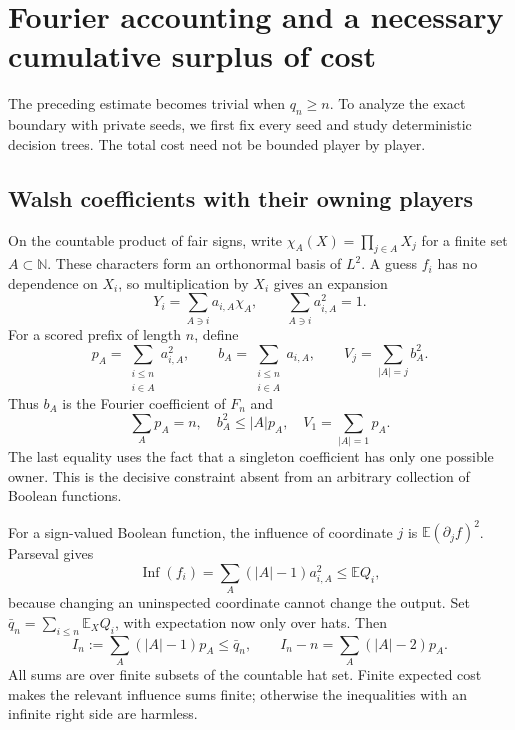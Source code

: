 \documentclass[11pt,letterpaper]{article}
\theoremstyle{definition}
\newcommand{\N}{\mathbb N}
\newcommand{\E}{\mathbb E}
\DeclareMathOperator{\Inf}{Inf}
\begin{document}
\section{Fourier accounting and a necessary cumulative surplus of cost}
\label{mbg:rnd:sec:fourier}

The preceding estimate becomes trivial when $q_n\ge n$. To analyze
the exact boundary with private seeds, we first fix every seed and
study deterministic decision trees. The total cost need not be bounded
player by player.

\subsection{Walsh coefficients with their owning players}

On the countable product of fair signs, write
$\chi_A(X)=\prod_{j\in A}X_j$ for a finite set $A\subset\N$.
These characters form an orthonormal basis of $L^2$. A guess $f_i$ has
no dependence on $X_i$, so multiplication by $X_i$ gives an expansion
\begin{equation}
 Y_i=\sum_{A\ni i}a_{i,A}\chi_A,
 \qquad \sum_{A\ni i}a_{i,A}^2=1.
 \label{mbg:rnd:eq:owner-expansion}
\end{equation}
For a scored prefix of length $n$, define
\[
 p_A=\sum_{\substack{i\le n\\i\in A}}a_{i,A}^2,
 \qquad b_A=\sum_{\substack{i\le n\\i\in A}}a_{i,A},
 \qquad V_j=\sum_{|A|=j}b_A^2.
\]
Thus $b_A$ is the Fourier coefficient of $F_n$ and
\begin{equation}
 \sum_Ap_A=n,\quad
 b_A^2\le |A|p_A,\quad
 V_1=\sum_{|A|=1}p_A.
 \label{mbg:rnd:eq:owner-counts}
\end{equation}
The last equality uses the fact that a singleton coefficient has only
one possible owner. This is the decisive constraint absent from an
arbitrary collection of Boolean functions.

For a sign-valued Boolean function, the influence of coordinate $j$ is
$\E(\partial_j f)^2$. Parseval gives
\[
 \Inf(f_i)=\sum_A(|A|-1)a_{i,A}^2\le\E Q_i,
\]
because changing an uninspected coordinate cannot change the output.
Set $\bar q_n=\sum_{i\le n}\E_X Q_i$, with expectation now only over hats.
Then
\begin{equation}
 I_n:=\sum_A(|A|-1)p_A\le \bar q_n,
 \qquad
 I_n-n=\sum_A(|A|-2)p_A.
 \label{mbg:rnd:eq:influence-budget}
\end{equation}
All sums are over finite subsets of the countable hat set. Finite
expected cost makes the relevant influence sums finite; otherwise the
inequalities with an infinite right side are harmless.
\end{document}
